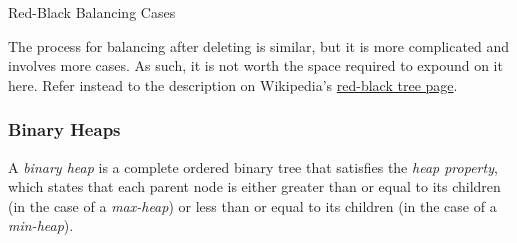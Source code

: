 \begin{algorithm}[H]
	\caption{Red-Black Balancing Cases}
\end{algorithm}
\vspace{5mm}

The process for balancing after deleting is similar, but it is more complicated and involves more cases. As such, it is not worth the space required to expound on it here. Refer instead to the description on Wikipedia's  \href{https://en.wikipedia.org/wiki/Red-black_tree#Removal}{red-black tree page}.

\subsubsection{Binary Heaps}

A \textit{binary heap} is a complete ordered binary tree that satisfies the \textit{heap property}, which states that each parent node is either greater than or equal to its children (in the case of a \textit{max-heap}) or less than or equal to its children (in the case of a \textit{min-heap}). \\

